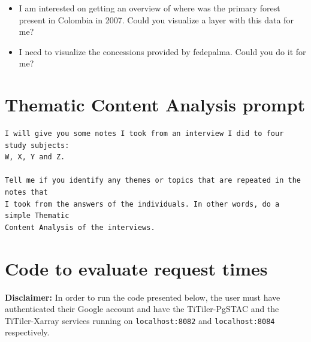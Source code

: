 \documentclass[
  oneside,
  open=any]{scrbook}
\providecommand{\tightlist}{%
  \setlength{\itemsep}{0pt}\setlength{\parskip}{0pt}}\usepackage{longtable,booktabs,array}
\begin{document}
\begin{itemize}
\tightlist
\item
  I am interested on getting an overview of where was the primary forest
  present in Colombia in 2007. Could you visualize a layer with this
  data for me?
\item
  I need to visualize the concessions provided by fedepalma. Could you
  do it for me?
\end{itemize}

\section{Thematic Content Analysis prompt}\label{sec-gpt-prompt}

\begin{verbatim}
I will give you some notes I took from an interview I did to four study subjects:
W, X, Y and Z.

Tell me if you identify any themes or topics that are repeated in the notes that 
I took from the answers of the individuals. In other words, do a simple Thematic
Content Analysis of the interviews.
\end{verbatim}

\section{Code to evaluate request times}\label{sec-request-code}

\textbf{Disclaimer:} In order to run the code presented below, the user
must have authenticated their Google account and have the TiTiler-PgSTAC
and the TiTiler-Xarray services running on \texttt{localhost:8082} and
\texttt{localhost:8084} respectively.
\end{document}
